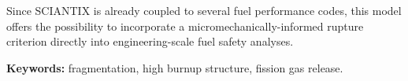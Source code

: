 \documentclass[11pt,a4paper]{article}
\begin{document}
Since SCIANTIX is already coupled to several fuel performance codes, this model offers the possibility to incorporate a micromechanically-informed rupture criterion directly into engineering-scale fuel safety analyses.

\medskip

\textbf{Keywords:} fragmentation, high burnup structure, fission gas release.
\end{document}
